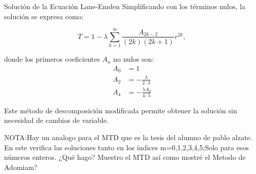 \begin{frame}{Solución de la Ecuación Lane-Emden}
    Simplificando con los términos nulos, la solución se expresa como:

    \begin{equation}
        T = 1 - \lambda \sum_{k=1}^{\infty} \frac{A_{2k-2}}{(2k)(2k+1)} r^{2k},
    \end{equation}

    donde los primeros coeficientes $A_n$ no nulos son:
    \begin{align*}
        A_{0} & = 1                                \\
        A_{2} & = -\frac{\lambda}{2 \cdot 3}       \\
        A_{4} & = -\frac{\lambda A_{2}}{4 \cdot 5}
    \end{align*}

    Este método de descomposición modificada permite obtener la solución sin necesidad de cambios de variable.

    NOTA:Hay un analogo para el MTD que es la tesis del alumno de pablo alzate.
    En este verifica las soluciones tanto en los índices m=0,1,2,3,4,5;Solo para esos números enteros.
    ¿Qué hago? Muestro el MTD así como mostré el Metodo de Adomiam?
\end{frame}